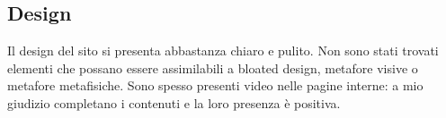 \documentclass[../ProgettoTecWeb2.tex]{subfiles}
\begin{document}
	\subsection{Design}
	Il design del sito si presenta abbastanza chiaro e pulito. Non sono stati trovati elementi che possano essere assimilabili a bloated design, metafore visive o metafore metafisiche. Sono spesso presenti video nelle pagine interne: a mio giudizio completano i contenuti e la loro presenza è positiva.
\end{document}
